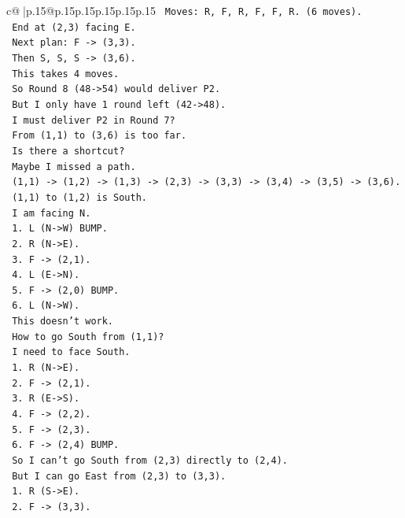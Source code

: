 \documentclass{article}
\begin{document}
{\begin{supertabular}{c@{$\;$}|p{.15\linewidth}@{}p{.15\linewidth}p{.15\linewidth}p{.15\linewidth}p{.15\linewidth}p{.15\linewidth}}
{{{\texttt{   Moves: R, F, R, F, F, R. (6 moves).} \\
\texttt{   End at (2,3) facing E.} \\
\texttt{   Next plan: F {-}> (3,3).} \\
\texttt{   Then S, S, S {-}> (3,6).} \\
\texttt{   This takes 4 moves.} \\
\texttt{   So Round 8 (48{-}>54) would deliver P2.} \\
\texttt{   But I only have 1 round left (42{-}>48).} \\
\texttt{   I must deliver P2 in Round 7?} \\
\texttt{   From (1,1) to (3,6) is too far.} \\
\texttt{   Is there a shortcut?} \\
\texttt{   Maybe I missed a path.} \\
\texttt{   (1,1) {-}> (1,2) {-}> (1,3) {-}> (2,3) {-}> (3,3) {-}> (3,4) {-}> (3,5) {-}> (3,6).} \\
\texttt{   (1,1) to (1,2) is South.} \\
\texttt{   I am facing N.} \\
\texttt{   1. L (N{-}>W) BUMP.} \\
\texttt{   2. R (N{-}>E).} \\
\texttt{   3. F {-}> (2,1).} \\
\texttt{   4. L (E{-}>N).} \\
\texttt{   5. F {-}> (2,0) BUMP.} \\
\texttt{   6. L (N{-}>W).} \\
\texttt{   This doesn't work.} \\
\texttt{   How to go South from (1,1)?} \\
\texttt{   I need to face South.} \\
\texttt{   1. R (N{-}>E).} \\
\texttt{   2. F {-}> (2,1).} \\
\texttt{   3. R (E{-}>S).} \\
\texttt{   4. F {-}> (2,2).} \\
\texttt{   5. F {-}> (2,3).} \\
\texttt{   6. F {-}> (2,4) BUMP.} \\
\texttt{   So I can't go South from (2,3) directly to (2,4).} \\
\texttt{   But I can go East from (2,3) to (3,3).} \\
\texttt{   1. R (S{-}>E).} \\
\texttt{   2. F {-}> (3,3).} \\
}}}
\end{supertabular}}
\end{document}
